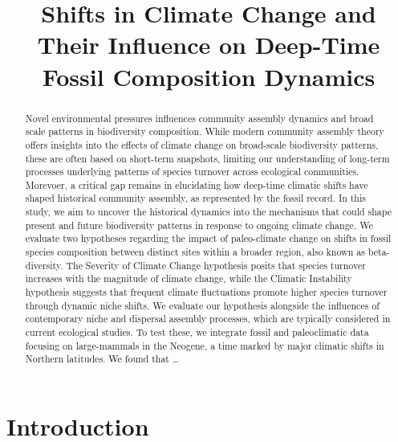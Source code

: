 \documentclass[
]{agujournal2019}
\begin{document}
\title{Shifts in Climate Change and Their Influence on Deep-Time Fossil
Composition Dynamics}




\begin{abstract}
Novel environmental pressures influences community assembly dynamics and
broad scale patterns in biodiversity composition. While modern community
assembly theory offers insights into the effects of climate change on
broad-scale biodiversity patterns, these are often based on short-term
snapshots, limiting our understanding of long-term processes underlying
patterns of species turnover across ecological communities. Morevoer, a
critical gap remains in elucidating how deep-time climatic shifts have
shaped historical community assembly, as represented by the fossil
record. In this study, we aim to uncover the historical dynamics into
the mechanisms that could shape present and future biodiversity patterns
in response to ongoing climate change. We evaluate two hypotheses
regarding the impact of paleo-climate change on shifts in fossil species
composition between distinct sites within a broader region, also known
as beta-diversity. The Severity of Climate Change hypothesis posits that
species turnover increases with the magnitude of climate change, while
the Climatic Instability hypothesis suggests that frequent climate
fluctuations promote higher species turnover through dynamic niche
shifts. We evaluate our hypothesis alongside the influences of
contemporary niche and dispersal assembly processes, which are typically
considered in current ecological studies. To test these, we integrate
fossil and paleoclimatic data focusing on large-mammals in the Neogene,
a time marked by major climatic shifts in Northern latitudes. We found
that \ldots{}
\end{abstract}





\section{Introduction}\label{introduction}
\end{document}
